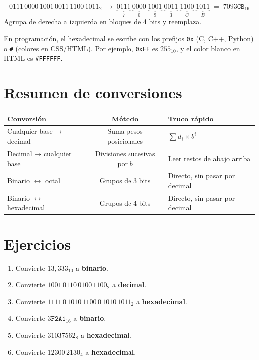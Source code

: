 \documentclass[12pt, oneside]{article}
\begin{document}
\begin{ejemplo}
\[
  0111\,0000\,1001\,0011\,1100\,1011_2
  \;\to\;
  \underbrace{0111}_{7}\;
  \underbrace{0000}_{0}\;
  \underbrace{1001}_{9}\;
  \underbrace{0011}_{3}\;
  \underbrace{1100}_{C}\;
  \underbrace{1011}_{B}
  \;=\; 7093\mathtt{CB}_{16}
\]
Agrupa de derecha a izquierda en bloques de 4 bits y reemplaza.
\end{ejemplo}

\begin{consejo}
  En programación, el hexadecimal se escribe con los prefijos
  \texttt{0x} (C, C++, Python) o \texttt{\#} (colores en CSS/HTML).
  Por ejemplo, \texttt{0xFF} es $255_{10}$, y el color blanco en HTML
  es \texttt{\#FFFFFF}.
\end{consejo}

\section{Resumen de conversiones}

\begin{center}
\begin{tabular}{lcl}
  \toprule
  \textbf{Conversión} & \textbf{Método} & \textbf{Truco rápido} \\
  \midrule
  Cualquier base → decimal & Suma pesos posicionales  & $\sum d_i \times b^i$ \\
  Decimal → cualquier base & Divisiones sucesivas por $b$ & Leer restos de abajo arriba \\
  Binario $\leftrightarrow$ octal           & Grupos de 3 bits            & Directo, sin pasar por decimal \\
  Binario $\leftrightarrow$ hexadecimal     & Grupos de 4 bits            & Directo, sin pasar por decimal \\
  \bottomrule
\end{tabular}
\end{center}

\section{Ejercicios}

\begin{enumerate}
  \item Convierte $13{,}333_{10}$ a \textbf{binario}.
  \item Convierte $1001\,0110\,0100\,1100_2$ a \textbf{decimal}.
  \item Convierte $1111\,0\,1010\,1100\,0\,1010\,1011_2$ a \textbf{hexadecimal}.
  \item Convierte $3\mathtt{F2A1}_{16}$ a \textbf{binario}.
  \item Convierte $31037562_8$ a \textbf{hexadecimal}.
  \item Convierte $12300\,2130_4$ a \textbf{hexadecimal}.
\end{enumerate}
\end{document}
